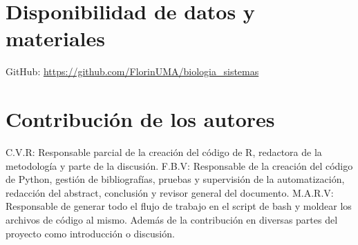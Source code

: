 \documentclass{bmcart}
\begin{document}
	\begin{backmatter}
	
		
		\section*{Disponibilidad de datos y materiales}%
			GitHub: \url{https://github.com/FlorinUMA/biologia_sistemas}
		
		\section*{Contribución de los autores}
			C.V.R: Responsable parcial de la creación del código de R, redactora de la metodología y parte de la discusión.
			F.B.V: Responsable de la creación del código de Python, gestión de bibliografías, pruebas y supervisión de la automatización, redacción del abstract, conclusión y revisor general del documento.
			M.A.R.V: Responsable de generar todo el flujo de trabajo en el script de bash y moldear los archivos de código al mismo. Además de la contribución en diversas partes del proyecto como introducción o discusión.
		
		
		
	
	\end{backmatter}
\end{document}
